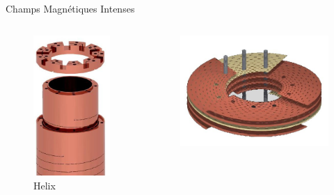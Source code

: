 \begin{frame}{Champs Magn\'etiques Intenses}
\begin{columns}[c]
 \begin{column}{2.5cm}
  \begin{figure}[H]
   \centering
   \includegraphics[scale=0.2]{Figures/cmi/Helices.png}
    \caption{Helix}
  \end{figure}
 \end{column}
 \begin{column}{3.4cm}
   \begin{figure}[H]
   \centering
   \includegraphics[scale=0.2]{Figures/cmi/Bitter.png}

\end{figure}
\end{column}
\end{columns}
\end{frame}
